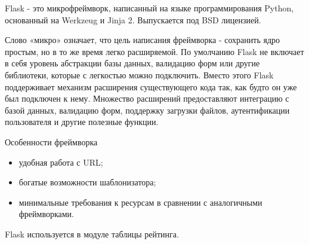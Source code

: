 Flask - это микрофреймворк, написанный на языке программирования Python, основанный на Werkzeug и Jinja 2. Выпускается под BSD лицензией.

Слово «микро» означает, что цель написания фреймворка - сохранить ядро простым, но в то же время легко расширяемой. По умолчанию Flask не включает в себя уровень абстракции базы данных, валидацию форм или другие библиотеки, которые с легкостью можно подключить. Вместо этого Flask поддерживает механизм расширения существующего кода так, как будто он уже был подключен к нему. Множество расширений предоставляют интеграцию с базой данных, валидацию форм, поддержку загрузки файлов, аутентификации пользователя и другие полезные функции.

Особенности фреймворка 
\begin{itemize}
\item удобная работа с URL;
\item богатые возможности шаблонизатора;
\item минимальные требования к ресурсам в сравнении с аналогичными фреймворками.
\end{itemize}

Flask используется в модуле таблицы рейтинга. 